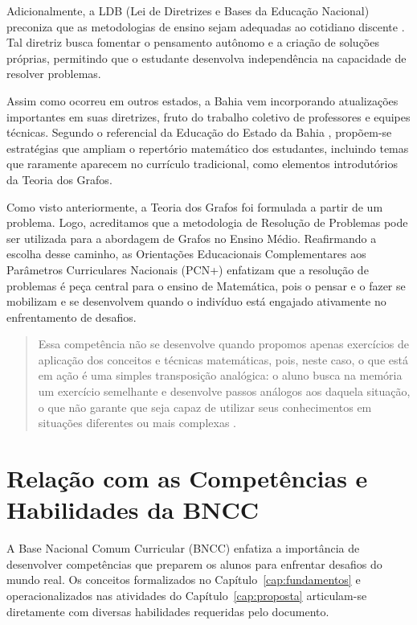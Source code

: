 \documentclass[
  12pt,
  oneside,
  a4paper,
  english,
  brazilian
  ]{abntex2}
\theoremstyle{definition}
\begin{document}
Adicionalmente, a LDB (Lei de Diretrizes e Bases da Educação Nacional) preconiza que as metodologias de ensino sejam adequadas ao cotidiano discente \cite{brasil1996}. Tal diretriz busca fomentar o pensamento autônomo e a criação de soluções próprias, permitindo que o estudante desenvolva independência na capacidade de resolver problemas.

Assim como ocorreu em outros estados, a Bahia vem incorporando atualizações importantes em suas diretrizes, fruto do trabalho coletivo de professores e equipes técnicas. Segundo o referencial da Educação do Estado da Bahia \cite{bahia2019}, propõem-se estratégias que ampliam o repertório matemático dos estudantes, incluindo temas que raramente aparecem no currículo tradicional, como elementos introdutórios da Teoria dos Grafos.

Como visto anteriormente, a Teoria dos Grafos foi formulada a partir de um problema. Logo, acreditamos que a metodologia de Resolução de Problemas pode ser utilizada para a abordagem de Grafos no Ensino Médio. Reafirmando a escolha desse caminho, as Orientações Educacionais Complementares aos Parâmetros Curriculares Nacionais (PCN+) enfatizam que a resolução de problemas é peça central para o ensino de Matemática, pois o pensar e o fazer se mobilizam e se desenvolvem quando o indivíduo está engajado ativamente no enfrentamento de desafios.

\begin{quote}
\small
Essa competência não se desenvolve quando propomos apenas exercícios de aplicação dos conceitos e técnicas matemáticas, pois, neste caso, o que está em ação é uma simples transposição analógica: o aluno busca na memória um exercício semelhante e desenvolve passos análogos aos daquela situação, o que não garante que seja capaz de utilizar seus conhecimentos em situações diferentes ou mais complexas \cite{brasil2002}.
\end{quote}

\section{Relação com as Competências e Habilidades da BNCC}

A Base Nacional Comum Curricular (BNCC) \cite{brasil2018} enfatiza a importância de desenvolver competências que preparem os alunos para enfrentar desafios do mundo real. Os conceitos formalizados no Capítulo~\ref{cap:fundamentos} e operacionalizados nas atividades do Capítulo~\ref{cap:proposta} articulam-se diretamente com diversas habilidades requeridas pelo documento. 
\end{document}
